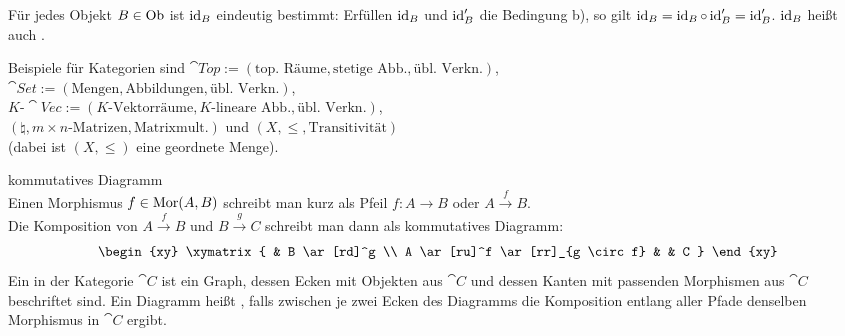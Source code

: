 \begin{Bem}
    Für jedes Objekt $B \in \text{Ob}$ ist $\operatorname{id}_B$ eindeutig bestimmt:
    Erfüllen $\operatorname{id}_B$ und $\operatorname{id}_B'$ die Bedingung b), so gilt
    $\operatorname{id}_B = \operatorname{id}_B \circ \operatorname{id}_B' = \operatorname{id}_B'$.
    $\operatorname{id}_B$ heißt auch .
\end{Bem}

\begin{Bsp}
    Beispiele für Kategorien sind
    $\cat{Top} := (\text{top. Räume}, \text{stetige Abb.},
    \text{übl. Verkn.})$, \\
    $\cat{Set} := (\text{Mengen}, \text{Abbildungen},
    \text{übl. Verkn.})$, \\
    $K\text{-}\cat{Vec} := (K\text{-Vektorräume}, K\text{-lineare Abb.},
    \text{übl. Verkn.})$, \\
    $(\natural, m \times n\text{-Matrizen}, \text{Matrixmult.})$ und
    $(X, \le, \text{Transitivität})$ \\
    (dabei ist $(X, \le)$ eine geordnete Menge).
\end{Bsp}

\linie

\begin{Def}{kommutatives Diagramm}\\
    Einen Morphismus $f \in \text{Mor}(A, B)$ schreibt man kurz als Pfeil
    $f\colon A \rightarrow B$ oder $A \xrightarrow{f} B$. \\
    Die Komposition von $A \xrightarrow{f} B$ und $B \xrightarrow{g} C$
    schreibt man dann als kommutatives Diagramm:
    \begin{align*}
        \begin{xy}
            \xymatrix{
                & B \ar[rd]^g \\
                A \ar[ru]^f \ar[rr]_{g \circ f} & & C
            }
        \end{xy}
    \end{align*}
    Ein  in der Kategorie $\cat{C}$ ist ein Graph, dessen
    Ecken mit Objekten aus $\cat{C}$ und dessen Kanten mit passenden
    Morphismen aus $\cat{C}$ beschriftet sind.
    Ein Diagramm heißt , falls zwischen je zwei Ecken des
    Diagramms die Komposition entlang aller Pfade denselben Morphismus
    in $\cat{C}$ ergibt.
\end{Def}

